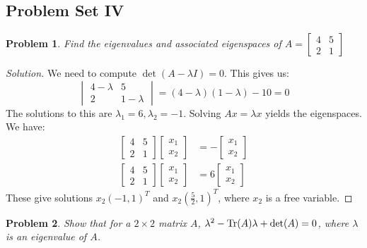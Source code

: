 \documentclass{article}
\theoremstyle{mystyle}
\newtheorem{problem}{Problem}[section]
\begin{document}
\subsection{Problem Set IV}
\begin{problem}
Find the eigenvalues and associated eigenspaces of $A = \begin{bmatrix}4 & 5 \\ 2 & 1 \end{bmatrix}$
\end{problem}
\begin{proof}[Solution]
We need to compute $\det(A-\lambda I)=0$. This gives us:
\begin{equation*}
    \begin{vmatrix} 4-\lambda & 5 \\ 2 & 1-\lambda \end{vmatrix} = (4-\lambda)(1-\lambda)-10 = 0
\end{equation*}
The solutions to this are $\lambda_1 = 6, \lambda_2 = -1$. Solving $Ax = \lambda x$ yields the eigenspaces. We have:
\begin{align*}
    \begin{bmatrix} 4 & 5 \\ 2 & 1 \end{bmatrix} \begin{bmatrix} x_1 \\ x_2 \end{bmatrix} &= -\begin{bmatrix} x_1 \\ x_2 \end{bmatrix}\\
    \begin{bmatrix} 4 & 5 \\ 2 & 1 \end{bmatrix} \begin{bmatrix} x_1 \\ x_2 \end{bmatrix} &= 6\begin{bmatrix} x_1 \\ x_2 \end{bmatrix}
\end{align*}
These give solutions $x_2(-1,1)^T$ and $x_2 (\frac{5}{2},1)^T$, where $x_2$ is a free variable.
\end{proof}
\begin{problem}
Show that for a $2\times 2$ matrix $A$, $\lambda^2 - \Tr(A)\lambda + \det(A) = 0$, where $\lambda$ is an eigenvalue of $A$.
\end{problem}
\end{document}
